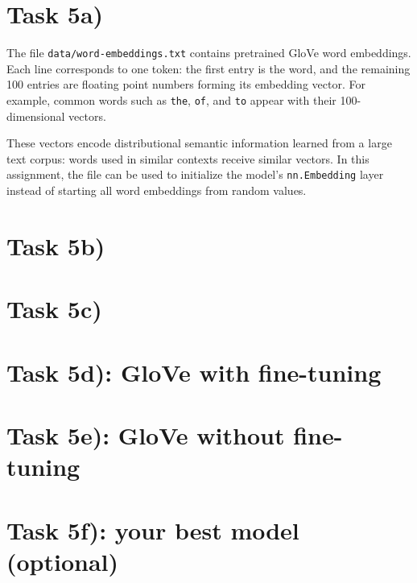 \documentclass[a4paper,oneside,bibliography=totoc]{scrartcl}
\begin{document}
\section*{Task 5a)}
\begin{answer}[5cm]
	The file \texttt{data/word-embeddings.txt} contains pretrained GloVe word
	embeddings. Each line corresponds to one token: the first entry is the word,
	and the remaining 100 entries are floating point numbers forming its
	embedding vector. For example, common words such as \texttt{the},
	\texttt{of}, and \texttt{to} appear with their 100-dimensional vectors.

	These vectors encode distributional semantic information learned from a
	large text corpus: words used in similar contexts receive similar vectors.
	In this assignment, the file can be used to initialize the model's
	\texttt{nn.Embedding} layer instead of starting all word embeddings from
	random values.
\end{answer}

\section*{Task 5b)}
\begin{answer}[18cm]
\end{answer}

\section*{Task 5c)}
\begin{answer}[16cm]
\end{answer}

\section*{Task 5d): GloVe with fine-tuning}
\begin{answer}[16cm]
\end{answer}

\section*{Task 5e): GloVe without fine-tuning}
\begin{answer}[16cm]
\end{answer}

\section*{Task 5f): your best model (optional)}
\begin{answer}[16cm]
\end{answer}


\clearpage

\end{document}
